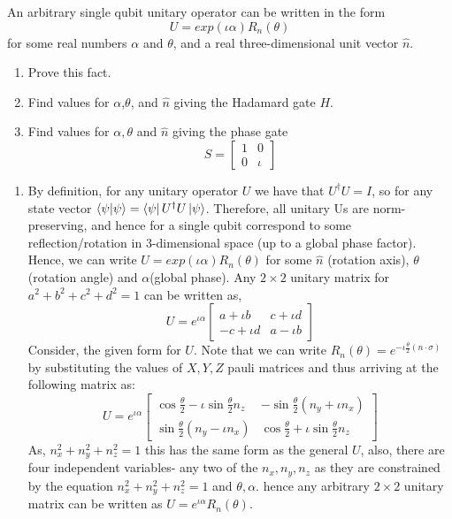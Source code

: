 \begin{example}
    An arbitrary single qubit unitary operator can be written in the form
    \[
    U=exp(\iota \alpha)R_n(\theta)
    \]
    for some real numbers $\alpha$ and $\theta$, and a real three-dimensional unit vector $\hat{n}$.
    \begin{enumerate}
        \item Prove this fact.
        \item Find values for $\alpha$,$\theta$, and $\hat{n}$ giving the Hadamard gate $H$.
        \item Find values for $\alpha,\theta$ and $\hat{n}$ giving the phase gate
        \[
        S=\begin{bmatrix} 1 & 0 \\ 0 & \iota \end{bmatrix}
        \]
    \end{enumerate}
    \begin{enumerate}
        \item By definition, for any unitary operator $U$ we have that $U^{\dagger}U=I$, so for any state vector $\braket{\psi|\psi}=\bra{\psi}U^{\dagger}U\ket{\psi}$. Therefore, all unitary Us are norm-preserving, and hence for a single qubit correspond to some reflection/rotation in 3-dimensional space (up to a global phase factor). Hence, we can write $U=exp(\iota \alpha)R_n(\theta)$ for some $\hat{n}$ (rotation axis), $\theta$ (rotation angle) and $\alpha$(global phase). Any $2\times 2$ unitary matrix for $a^2+b^2+c^2+d^2=1$ can be written as,
        \[
        U=e^{\iota \alpha} \begin{bmatrix} a +\iota b & c+\iota d \\ -c+\iota d & a-\iota b \end{bmatrix}
        \]
        Consider, the given form for $U$. Note that we can write $R_n(\theta)=e^{-\iota \frac{\theta}{2} (n\cdot \sigma)}$ by substituting the values of $X, Y, Z$ pauli matrices and thus arriving at the following matrix as:
        \[
        U=e^{\iota \alpha}\begin{bmatrix} \cos \frac{\theta}{2} - \iota \sin \frac{\theta}{2} n_z & -\sin \frac{\theta}{2} (n_y+\iota n_x)\\ \sin \frac{\theta}{2} (n_y-\iota n_x) & \cos\frac{\theta}{2} + \iota \sin \frac{\theta}{2} n_z \end{bmatrix}
        \]
        As, $n_x^2+n_y^2+n_z^2=1$ this has the same form as the general $U$, also, there are four independent variables- any two of the $n_x,n_y,n_z$ as they are constrained by the equation $n_x^2+n_y^2+n_z^2=1$ and $\theta, \alpha$. hence any arbitrary $2\times 2$ unitary matrix can be written as $U=e^{\iota \alpha}R_n(\theta)$.

\end{enumerate}
\end{example}
